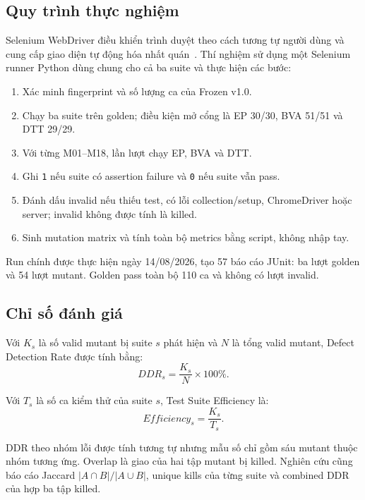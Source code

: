 \documentclass[runningheads]{llncs}
\begin{document}
\subsection{Quy trình thực nghiệm}

Selenium WebDriver điều khiển trình duyệt theo cách tương tự người dùng và cung cấp giao diện tự động hóa nhất quán~\cite{seleniumwebdriver}. Thí nghiệm sử dụng một Selenium runner Python dùng chung cho cả ba suite và thực hiện các bước:
\begin{enumerate}[leftmargin=*]
  \item Xác minh fingerprint và số lượng ca của Frozen v1.0.
  \item Chạy ba suite trên golden; điều kiện mở cổng là EP 30/30, BVA 51/51 và DTT 29/29.
  \item Với từng M01--M18, lần lượt chạy EP, BVA và DTT.
  \item Ghi \texttt{1} nếu suite có assertion failure và \texttt{0} nếu suite vẫn pass.
  \item Đánh dấu invalid nếu thiếu test, có lỗi collection/setup, ChromeDriver hoặc server; invalid không được tính là killed.
  \item Sinh mutation matrix và tính toàn bộ metrics bằng script, không nhập tay.
\end{enumerate}

Run chính được thực hiện ngày 14/08/2026, tạo 57 báo cáo JUnit: ba lượt golden và 54 lượt mutant. Golden pass toàn bộ 110 ca và không có lượt invalid.

\subsection{Chỉ số đánh giá}

Với $K_s$ là số valid mutant bị suite $s$ phát hiện và $N$ là tổng valid mutant, Defect Detection Rate được tính bằng:
\begin{equation}
DDR_s = \frac{K_s}{N}\times 100\%.
\label{eq:ddr}
\end{equation}

Với $T_s$ là số ca kiểm thử của suite $s$, Test Suite Efficiency là:
\begin{equation}
Efficiency_s = \frac{K_s}{T_s}.
\label{eq:efficiency}
\end{equation}

DDR theo nhóm lỗi được tính tương tự nhưng mẫu số chỉ gồm sáu mutant thuộc nhóm tương ứng. Overlap là giao của hai tập mutant bị killed. Nghiên cứu cũng báo cáo Jaccard $|A\cap B|/|A\cup B|$, unique kills của từng suite và combined DDR của hợp ba tập killed.
\end{document}
